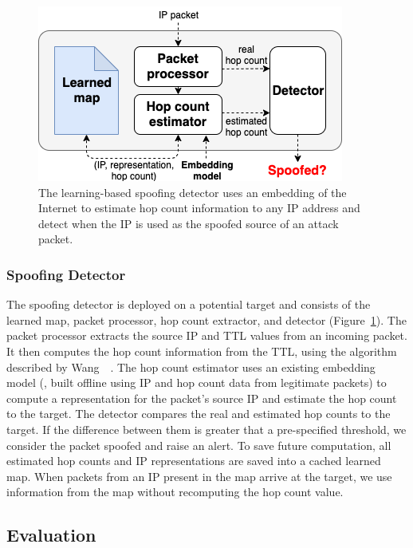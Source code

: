 \begin{figure}[t]
	\centering
	\includegraphics[width=.6\linewidth]{Graph/spoof/spoofing-detector.png}
	\caption{The learning-based spoofing detector uses an embedding of the Internet to estimate hop count information to any IP address and detect when the IP is used as the spoofed source of an attack packet.}
	\label{fig:detector}
\end{figure}

\subsubsection{Spoofing Detector}

The spoofing detector is deployed on a potential target and consists of the learned map, packet processor, hop count extractor, and detector (Figure~\ref{fig:detector}). The packet processor extracts the source IP and TTL values from an incoming packet. It then computes the hop count information from the TTL, using the algorithm described by Wang~\etal{}~\citep{iphc}. The hop count estimator uses an existing embedding model (\ie{}, built offline using IP and hop count data from legitimate packets) to compute a representation for the packet's source IP and estimate the hop count to the target. 
%
The detector compares the real and estimated hop counts to the target. If the difference between them is greater that a pre-specified threshold, we consider the packet spoofed and raise an alert.
%
To save future computation, all estimated hop counts and IP representations are saved into a cached learned map. When packets from an IP present in the map arrive at the target, we use information from the map without recomputing the hop count value.



\subsection{Evaluation}
\label{spoof:eval}

